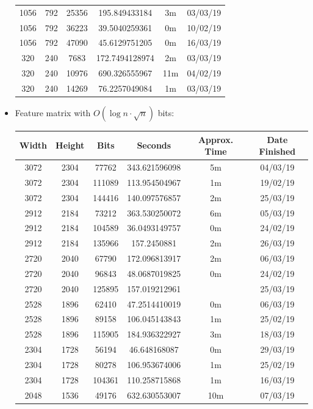 \documentclass[11pt,a4paper]{report}
\begin{document}
\begin{itemize}
\begin{center}
\begin{tabular}{ c c c | c c c }
  1056 & 792 & 25356 & 195.849433184 & 3m & 03/03/19 \\
  1056 & 792 & 36223 & 39.5040259361 & 0m & 10/02/19 \\
  1056 & 792 & 47090 & 45.6129751205 & 0m & 16/03/19 \\
  320 & 240 & 7683 & 172.7494128974 & 2m & 03/03/19 \\
  320 & 240 & 10976 & 690.326555967 & 11m & 04/02/19 \\
  320 & 240 & 14269 & 76.2257049084 & 1m & 03/03/19 \\
  \end{tabular}
  \end{center}

\newpage
\item Feature matrix with $O(\log{n} \cdot \sqrt{n})$ bits:
  \begin{center}
  \begin{tabular}{ c c c | c c c }
  Width & Height & Bits & Seconds & Approx. Time & Date Finished \\ \hline
  3072 & 2304 & 77762 & 343.621596098 & 5m & 04/03/19 \\
  3072 & 2304 & 111089 & 113.954504967 & 1m & 19/02/19 \\
  3072 & 2304 & 144416 & 140.097576857 & 2m & 25/03/19 \\
  2912 & 2184 & 73212 & 363.530250072 & 6m & 05/03/19 \\
  2912 & 2184 & 104589 & 36.0493149757 & 0m & 24/02/19 \\
  2912 & 2184 & 135966 & 157.2450881 & 2m & 26/03/19 \\
  2720 & 2040 & 67790 & 172.096813917 & 2m & 06/03/19 \\
  2720 & 2040 & 96843 & 48.0687019825 & 0m & 24/02/19 \\
  2720 & 2040 & 125895 & 157.019212961 &  & 25/03/19 \\
  2528 & 1896 & 62410 & 47.2514410019 & 0m & 06/03/19 \\
  2528 & 1896 & 89158 & 106.045143843 & 1m & 25/02/19 \\
  2528 & 1896 & 115905 & 184.936322927 & 3m & 18/03/19 \\
  2304 & 1728 & 56194 & 46.648168087 & 0m & 29/03/19 \\
  2304 & 1728 & 80278 & 106.953674006 & 1m & 25/02/19 \\
  2304 & 1728 & 104361 & 110.258715868 & 1m & 16/03/19 \\
  2048 & 1536 & 49176 & 632.630553007 & 10m & 07/03/19 \\

\end{tabular}
\end{center}
\end{itemize}
\end{document}
